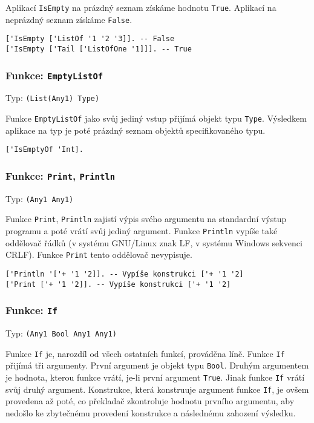 Aplikací \lstinline{IsEmpty} na prázdný seznam získáme hodnotu \lstinline{True}. Aplikací
na neprázdný seznam získáme \lstinline{False}.

\begin{lstlisting}[caption={Ukázka využití IsEmpty}]
['IsEmpty ['ListOf '1 '2 '3]]. -- False
['IsEmpty ['Tail ['ListOfOne '1]]]. -- True
\end{lstlisting}

\subsubsection*{Funkce: \lstinline|EmptyListOf|}
Typ: \lstinline{(List(Any1) Type)}

Funkce \lstinline{EmptyListOf} jako svůj jediný vstup přijímá objekt typu \lstinline{Type}.
Výsledkem aplikace na typ je poté prázdný seznam objektů specifikovaného typu.

\begin{lstlisting}[caption={Ukázka využití EmptyListOf}]
['IsEmptyOf 'Int].
\end{lstlisting}

\subsubsection*{Funkce: \lstinline|Print|, \lstinline{Println}}
Typ: \lstinline{(Any1 Any1)}

Funkce \lstinline{Print}, \lstinline{Println} zajistí výpis svého argumentu na standardní výstup
programu a poté vrátí svůj jediný argument. Funkce \lstinline{Println} vypíše také oddělovač řádků
(v systému GNU/Linux znak LF, v systému Windows sekvenci CRLF). Funkce \lstinline{Print} tento
oddělovač nevypisuje.

\begin{lstlisting}[caption={Ukázka využití Print, Println}]
['Println '['+ '1 '2]]. -- Vypíše konstrukci ['+ '1 '2]
['Print ['+ '1 '2]]. -- Vypíše konstrukci ['+ '1 '2]
\end{lstlisting}

\subsubsection*{Funkce: \lstinline{If}}
Typ: \lstinline{(Any1 Bool Any1 Any1)}

Funkce \lstinline{If} je, narozdíl od všech ostatních funkcí, prováděna líně. Funkce \lstinline{If}
přijímá tři argumenty. První argument je objekt typu \lstinline{Bool}. Druhým argumentem je hodnota,
kterou funkce vrátí, je-li první argument \lstinline{True}. Jinak funkce \lstinline{If} vrátí svůj
druhý argument. Konstrukce, která konstruuje argument funkce \lstinline{If}, je ovšem provedena až
poté, co překladač zkontroluje hodnotu prvního argumentu, aby nedošlo ke zbytečnému provedení
konstrukce a následnému zahození výsledku.

